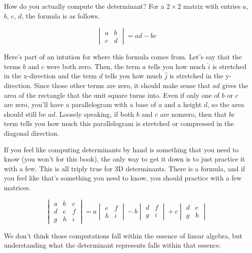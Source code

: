 How do you actually compute the determinant? For a $2 \times 2$ matrix with
entries $a$, $b$, $c$, $d$, the formula is as follows.

\begin{equation*}
  \begin{vmatrix}
    a & b \\
    c & d
  \end{vmatrix} = ad - bc
\end{equation*}

Here's part of an intution for where this formula comes from. Let's say that the
terms $b$ and $c$ were both zero. Then, the term $a$ tells you how much
$\hat{i}$ is stretched in the x-direction and the term $d$ tells you how much
$\hat{j}$ is stretched in the y-direction. Since those other terms are zero, it
should make sense that $ad$ gives the area of the rectangle that the unit square
turns into. Even if only one of $b$ or $c$ are zero, you'll have a parallelogram
with a base of $a$ and a height $d$, so the area should still be $ad$. Loosely
speaking, if both $b$ and $c$ are nonzero, then that $bc$ term tells you how
much this parallelogram is stretched or compressed in the diagonal direction.

If you feel like computing determinants by hand is something that you need to
know (you won't for this book), the only way to get it down is to just practice
it with a few. This is all triply true for 3D determinants. There is a formula,
and if you feel like that's something you need to know, you should practice with
a few matrices.

\begin{equation*}
  \begin{vmatrix}
    a & b & c \\
    d & e & f \\
    g & h & i
  \end{vmatrix} =
  a \begin{vmatrix}
    e & f \\
    h & i
  \end{vmatrix}
  - b \begin{vmatrix}
    d & f \\
    g & i
  \end{vmatrix}
  + c \begin{vmatrix}
    d & e \\
    g & h
  \end{vmatrix}
\end{equation*}

We don't think those computations fall within the essence of linear algebra, but
understanding what the determinant represents falls within that essence.
